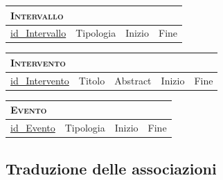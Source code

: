 	\begin{tabular}{|l|l|l|l|}
		\multicolumn{4}{l}{\textsc{Intervallo}} \\ \hline
		\underline{id\_Intervallo} & Tipologia & Inizio & Fine \\ \hline
	\end{tabular}


	\begin{tabular}{|l|l|l|l|l|}
		\multicolumn{5}{l}{\textsc{Intervento}} \\ \hline
		\underline{id\_Intervento} & Titolo & Abstract & Inizio & Fine \\ \hline
	\end{tabular}


	\begin{tabular}{|l|l|l|l|}
		\multicolumn{4}{l}{\textsc{Evento}} \\ \hline
		\underline{id\_Evento} & Tipologia & Inizio & Fine \\ \hline
	\end{tabular}

\subsection{Traduzione delle associazioni}
